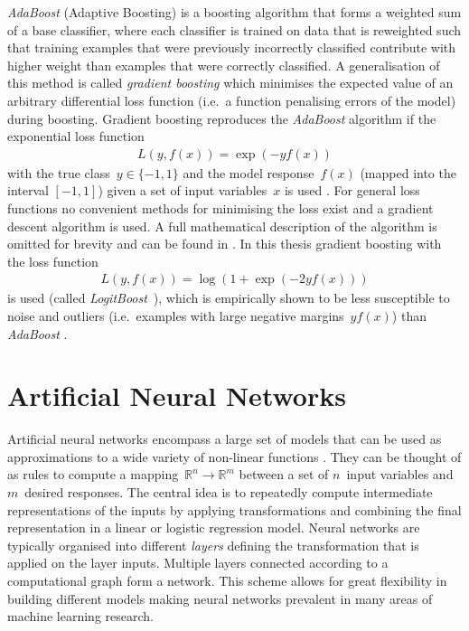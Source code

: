 \emph{AdaBoost} (Adaptive Boosting) is a boosting algorithm that forms a
weighted sum of a base classifier, where each classifier is trained on data that
is reweighted such that training examples that were previously incorrectly
classified contribute with higher weight than examples that were correctly
classified. A generalisation of this method is called \emph{gradient boosting}
which minimises the expected value of an arbitrary differential loss function
(i.e.\ a function penalising errors of the model) during boosting. Gradient
boosting reproduces the \emph{AdaBoost} algorithm if the exponential loss
function
\begin{align*}
  L\left(y, f(x)\right) = \exp\left(- y f(x)\right)
\end{align*}
with the true class~$y \in \{ -1, 1 \}$ and the model response~$f(x)$ (mapped
into the interval $[-1, 1]$) given a set of input variables~$x$ is used
\cite{esl}. For general loss functions no convenient methods for minimising the
loss exist and a gradient descent algorithm is used. A full mathematical
description of the algorithm is omitted for brevity and can be found in
\cite{friedman_gbm, esl}. In this thesis gradient boosting with the loss
function
\begin{align*}
  L\left(y, f(x)\right) = \log\left( 1 + \exp(- 2 y f(x)) \right)
\end{align*}
is used (called \emph{LogitBoost}~\cite{logitboost}), which is empirically shown
to be less susceptible to noise and outliers (i.e.\ examples with large negative
margins~$y f(x)$) than \emph{AdaBoost} \cite{esl, schapire_boosting}.

\section{Artificial Neural Networks}
\label{sec:nn}

Artificial neural networks encompass a large set of models that can be used as
approximations to a wide variety of non-linear functions \cite{hornik}. They can
be thought of as rules to compute a
mapping~\mbox{$\mathbb{R}^n \rightarrow \mathbb{R}^m$} between a set of
$n$~input variables and $m$~desired responses. The central idea is to repeatedly
compute intermediate representations of the inputs by applying transformations
and combining the final representation in a linear or logistic regression model.
Neural networks are typically organised into different \emph{layers} defining
the transformation that is applied on the layer inputs. Multiple layers
connected according to a computational graph form a network. This scheme allows
for great flexibility in building different models making neural networks
prevalent in many areas of machine learning research.

